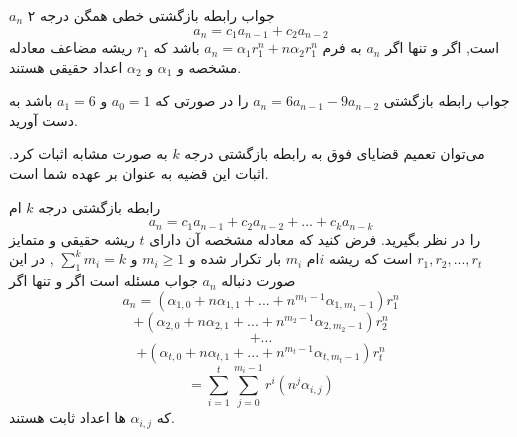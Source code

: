 \begin{THEOREM}
    \p
    \p$a_n$
    جواب رابطه‌ بازگشتی خطی همگن درجه ۲ 
    $$a_n=c_1 a_{n-1}+c_2 a_{n-2}$$
    است, اگر و تنها اگر
    $a_n$
    به فرم
    $a_n=\alpha_1 r_1^n+n\alpha_2 r_1^n$ 
    باشد
    که
    $r_1$
    ریشه مضاعف معادله مشخصه و 
    $\alpha_1$
    و
    $\alpha_2$
    اعداد حقیقی
    هستند.

\end{THEOREM}
\begin{PROBLEM}
    \p
    جواب رابطه‌ بازگشتی 
    $a_n=6a_{n-1}-9a_{n-2}$
    را در صورتی که
    $a_0=1$
    و
    $a_1=6$
    باشد به دست آورید.
\end{PROBLEM}
\p
می‌توان تعمیم قضایای فوق به رابطه‌ بازگشتی درجه
$k$
به صورت مشابه اثبات کرد.
اثبات این قضیه
به عنوان 
 بر عهده شما است.
%


\begin{THEOREM}
    \p
    رابطه‌ بازگشتی درجه 
    $k$
    ام
    \[a_n=c_{1}a_{n-1}+c_{2}a_{n-2}+...+c_{k}a_{n-k}\]
    را در نظر بگیرید. فرض کنید که معادله مشخصه آن دارای 
    $t$
    ریشه حقیقی و متمایز 
    $r_1, r_2, ..., r_t $
    است که ریشه
    $i$ام 
    $m_i$
    بار تکرار شده و  
    $m_i \geq 1$
    و
    $\sum_1^k m_i=k$
    ,
    در این صورت دنباله 
    $a_n$
    جواب مسئله است اگر و تنها اگر
    \[a_n=(\alpha_{1,0}+ n\alpha_{1,1} + ... + n^{m_1-1}\alpha_{1,m_1-1})r_1^n\]
    \[+(\alpha_{2,0}+ n\alpha_{2,1} + ... + n^{m_2-1}\alpha_{2,m_2-1})r_2^n\]
    \[+...\]
    \[+ (\alpha_{t,0} + n\alpha_{t,1} + ... + n^{m_t-1}\alpha_{t,m_t-1})r_t^n\]
    \[=\sum_{i=1}^t\sum_{j=0}^{m_i-1}r^i(n^j\alpha_{i,j})\]
    که
    $\alpha_{i,j}$
    ها
    اعداد ثابت هستند.

\end{THEOREM}

